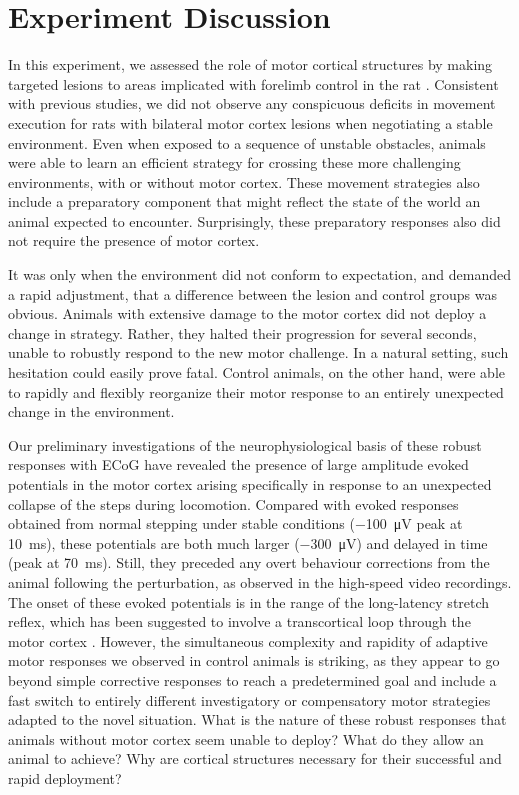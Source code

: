 \section{Experiment Discussion}

In this experiment, we assessed the role of motor cortical structures by making targeted lesions to areas implicated with forelimb control in the rat \citep{Kawai2015,Otchy2015}. Consistent with previous studies, we did not observe any conspicuous deficits in movement execution for rats with bilateral motor cortex lesions when negotiating a stable environment. Even when exposed to a sequence of unstable obstacles, animals were able to learn an efficient strategy for crossing these more challenging environments, with or without motor cortex. These movement strategies also include a preparatory component that might reflect the state of the world an animal expected to encounter. Surprisingly, these preparatory responses also did not require the presence of motor cortex.

It was only when the environment did not conform to expectation, and demanded a rapid adjustment, that a difference between the lesion and control groups was obvious. Animals with extensive damage to the motor cortex did not deploy a change in strategy. Rather, they halted their progression for several seconds, unable to robustly respond to the new motor challenge. In a natural setting, such hesitation could easily prove fatal. Control animals, on the other hand, were able to rapidly and flexibly reorganize their motor response to an entirely unexpected change in the environment.

Our preliminary investigations of the neurophysiological basis of these robust responses with ECoG have revealed the presence of large amplitude evoked potentials in the motor cortex arising specifically in response to an unexpected collapse of the steps during locomotion. Compared with evoked responses obtained from normal stepping under stable conditions (\SI{-100}{\micro\volt} peak at \SI{10}{\milli\second}), these potentials are both much larger (\SI{-300}{\micro\volt}) and delayed in time (peak at \SI{70}{\milli\second}). Still, they preceded any overt behaviour corrections from the animal following the perturbation, as observed in the high-speed video recordings. The onset of these evoked potentials is in the range of the long-latency stretch reflex, which has been suggested to involve a transcortical loop through the motor cortex \citep{Phillips1969,Matthews1990,Capaday1991}. However, the simultaneous complexity and rapidity of adaptive motor responses we observed in control animals is striking, as they appear to go beyond simple corrective responses to reach a predetermined goal and include a fast switch to entirely different investigatory or compensatory motor strategies adapted to the novel situation. What is the nature of these robust responses that animals without motor cortex seem unable to deploy? What do they allow an animal to achieve? Why are cortical structures necessary for their successful and rapid deployment?


